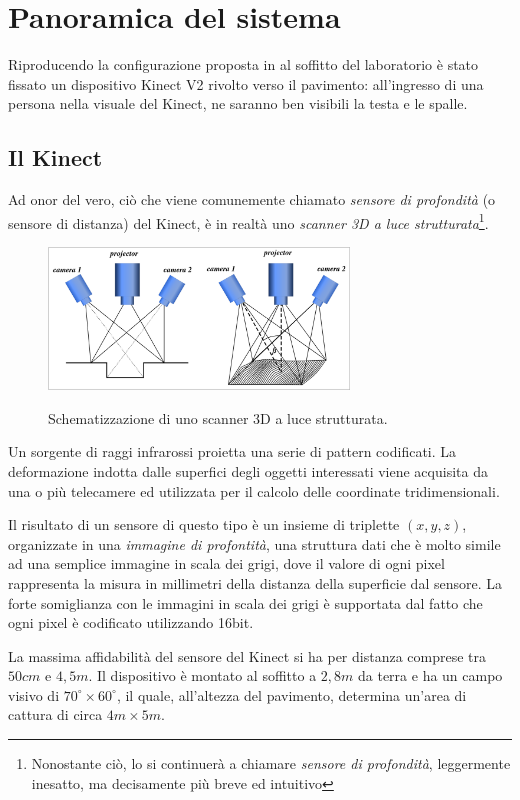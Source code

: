 
\chapter{Panoramica del sistema}
\label{cap:overview}
Riproducendo la configurazione proposta in \cite{Zhu13} al soffitto del laboratorio è stato fissato un dispositivo Kinect V2 rivolto verso il pavimento: all'ingresso di una persona nella visuale del Kinect, ne saranno ben visibili la testa e le spalle.

\section{Il Kinect}
\label{sec:sensor}
Ad onor del vero, ciò che viene comunemente chiamato \emph{sensore di profondità} (o sensore di distanza) del Kinect, è in realtà uno \emph{scanner 3D a luce strutturata}\footnote{Nonostante ciò, lo si continuerà a chiamare \emph{sensore di profondità}, leggermente inesatto, ma decisamente più breve ed intuitivo}.
\begin{figure}
    \centering
    \includegraphics[width=8cm]{img/3d-structured-light-scanner.png}
    \label{fig:structured_light_scanner}
    \caption{Schematizzazione di uno scanner 3D a luce strutturata.}
\end{figure}
Un sorgente di raggi infrarossi proietta una serie di pattern codificati. La deformazione indotta dalle superfici degli oggetti interessati viene acquisita da una o più telecamere ed utilizzata per il calcolo delle coordinate tridimensionali.

Il risultato di un sensore di questo tipo è un insieme di triplette $(x,y,z)$, organizzate in una \emph{immagine di profontità}, una struttura dati che è molto simile ad una semplice immagine in scala dei grigi, dove il valore di ogni pixel rappresenta la misura in millimetri della distanza della superficie dal sensore.
La forte somiglianza con le immagini in scala dei grigi è supportata dal fatto che ogni pixel è codificato utilizzando 16bit.

La massima affidabilità del sensore del Kinect si ha per distanza comprese tra $50cm$ e $4,5m$.
Il dispositivo è montato al soffitto a $2,8m$ da terra e ha un campo visivo di $70^{\circ} \times 60^{\circ}$, il quale, all'altezza del pavimento, determina un'area di cattura di circa $4m \times 5m$.

